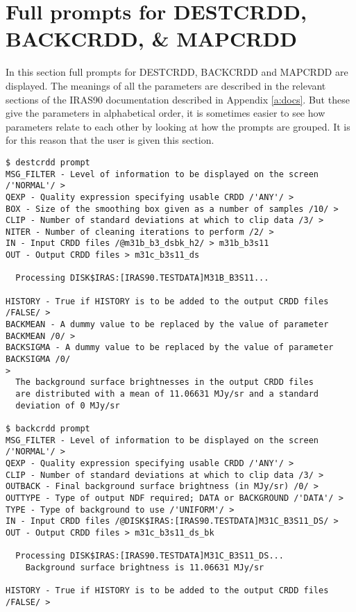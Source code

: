 \section{Full prompts for DESTCRDD, BACKCRDD, \& MAPCRDD}
\label{a:fulldbm}
In this section full prompts for DESTCRDD, BACKCRDD and MAPCRDD are displayed.
The meanings of all the parameters are described in the relevant sections of
the IRAS90 documentation described in Appendix \ref{a:docs}. But these give the 
parameters in alphabetical order, it is sometimes easier to see how parameters
relate to each other by looking at how the prompts are grouped. It is for this 
reason that the user is given this section.
\begin{small}
\begin{verbatim}
$ destcrdd prompt
MSG_FILTER - Level of information to be displayed on the screen /'NORMAL'/ > 
QEXP - Quality expression specifying usable CRDD /'ANY'/ > 
BOX - Size of the smoothing box given as a number of samples /10/ > 
CLIP - Number of standard deviations at which to clip data /3/ > 
NITER - Number of cleaning iterations to perform /2/ > 
IN - Input CRDD files /@m31b_b3_dsbk_h2/ > m31b_b3s11
OUT - Output CRDD files > m31c_b3s11_ds

  Processing DISK$IRAS:[IRAS90.TESTDATA]M31B_B3S11...

HISTORY - True if HISTORY is to be added to the output CRDD files /FALSE/ > 
BACKMEAN - A dummy value to be replaced by the value of parameter BACKMEAN /0/ >
BACKSIGMA - A dummy value to be replaced by the value of parameter BACKSIGMA /0/
> 
  The background surface brightnesses in the output CRDD files
  are distributed with a mean of 11.06631 MJy/sr and a standard
  deviation of 0 MJy/sr

$ backcrdd prompt
MSG_FILTER - Level of information to be displayed on the screen /'NORMAL'/ > 
QEXP - Quality expression specifying usable CRDD /'ANY'/ > 
CLIP - Number of standard deviations at which to clip data /3/ > 
OUTBACK - Final background surface brightness (in MJy/sr) /0/ > 
OUTTYPE - Type of output NDF required; DATA or BACKGROUND /'DATA'/ > 
TYPE - Type of background to use /'UNIFORM'/ > 
IN - Input CRDD files /@DISK$IRAS:[IRAS90.TESTDATA]M31C_B3S11_DS/ >
OUT - Output CRDD files > m31c_b3s11_ds_bk

  Processing DISK$IRAS:[IRAS90.TESTDATA]M31C_B3S11_DS...
    Background surface brightness is 11.06631 MJy/sr

HISTORY - True if HISTORY is to be added to the output CRDD files /FALSE/ > 


\end{verbatim}
\end{small}
